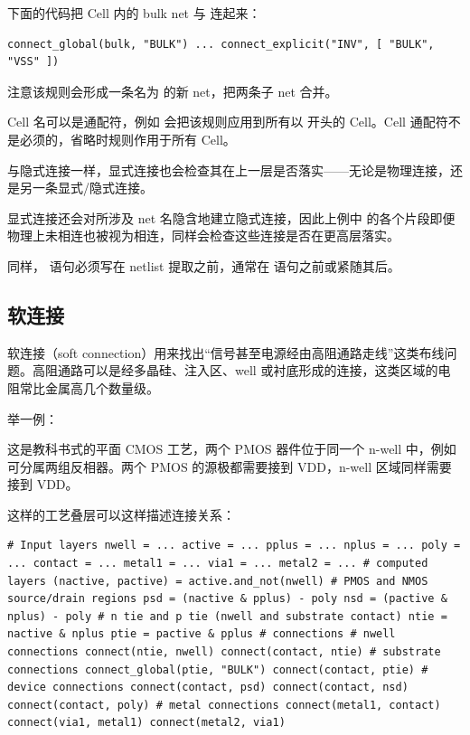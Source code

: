 下面的代码把  Cell 内的 bulk net 与  连起来：

\begin{lstlisting}
connect_global(bulk, "BULK") ... connect_explicit("INV", [ "BULK", "VSS" ])
\end{lstlisting}

注意该规则会形成一条名为  的新 net，把两条子 net 合并。

Cell 名可以是通配符，例如  会把该规则应用到所有以  开头的 Cell。Cell 通配符不是必须的，省略时规则作用于所有 Cell。

与隐式连接一样，显式连接也会检查其在上一层是否落实——无论是物理连接，还是另一条显式/隐式连接。

显式连接还会对所涉及 net 名隐含地建立隐式连接，因此上例中  的各个片段即便物理上未相连也被视为相连，同样会检查这些连接是否在更高层落实。

同样， 语句必须写在 netlist 提取之前，通常在  语句之前或紧随其后。

\subsection{软连接}

软连接（soft connection）用来找出“信号甚至电源经由高阻通路走线”这类布线问题。高阻通路可以是经多晶硅、注入区、well 或衬底形成的连接，这类区域的电阻常比金属高几个数量级。

举一例：


这是教科书式的平面 CMOS 工艺，两个 PMOS 器件位于同一个 n-well 中，例如可分属两组反相器。两个 PMOS 的源极都需要接到 VDD，n-well 区域同样需要接到 VDD。

这样的工艺叠层可以这样描述连接关系：

\begin{lstlisting}
# Input layers nwell = ... active = ... pplus = ... nplus = ... poly = ... contact = ... metal1 = ... via1 = ... metal2 = ... # computed layers (nactive, pactive) = active.and_not(nwell) # PMOS and NMOS source/drain regions psd = (nactive & pplus) - poly nsd = (pactive & nplus) - poly # n tie and p tie (nwell and substrate contact) ntie = nactive & nplus ptie = pactive & pplus # connections # nwell connections connect(ntie, nwell) connect(contact, ntie) # substrate connections connect_global(ptie, "BULK") connect(contact, ptie) # device connections connect(contact, psd) connect(contact, nsd) connect(contact, poly) # metal connections connect(metal1, contact) connect(via1, metal1) connect(metal2, via1)
\end{lstlisting}

